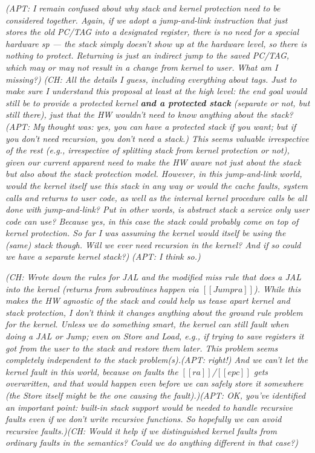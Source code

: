 \documentclass{article}
\newcommand{\ch}[1]{{\color{dkblue}\em (CH: #1)}}
\newcommand{\apt}[1]{{\color{red}\em (APT: #1)}}
\newcommand*{\EG}{e.g.,\xspace}
\begin{document}
\apt{I remain confused about why stack and kernel protection need to be considered
together.  Again, if we adopt a jump-and-link instruction that just stores
the old PC/TAG into a designated register, there is no need for a special hardware
sp --- the stack simply doesn't show up at the hardware level, so there is nothing
to protect. Returning is just an indirect jump to the saved PC/TAG, which 
may or may not result in a change from kernel to user. What am I missing?}
\ch{All the details I guess, including everything about tags. Just to
  make sure I understand this proposal at least at the high level: the
  end goal would still be to provide a protected kernel {\bf and a
    protected stack} (separate or not, but still there), just that the
  HW wouldn't need to know anything about the stack?
\apt{My thought was: yes, you can have a protected stack if you want; 
  but if you don't need recursion, you don't need a stack.} 
This seems
  valuable irrespective of the rest (\EG irrespective of splitting
  stack from kernel protection or not), given our current apparent
  need to make the HW aware not just about the stack but also about
  the stack protection model.  However, in this jump-and-link world,
  would the kernel itself use this stack in any way or would the
  cache faults, system calls and returns to user code,
  as well as the internal kernel procedure calls
  be all done with jump-and-link? Put in other words, is
  abstract stack a service only user code can use? Because yes, in
  this case the stack could probably come on top of kernel
  protection. So far I was assuming the kernel would itself be using
  the (same) stack though. Will we ever need recursion in the kernel?
  And if so could we have a separate kernel stack?}
\apt{I think so.}

\ottusedrule{\ottdruleStepXXJALXXHit{}}
\ottusedrule{\ottdruleStepXXMissNew{}}

\ch{Wrote down the rules for JAL and the modified miss rule that
  does a JAL into the kernel (returns from subroutines happen via
  $[[Jump ra]]$).
  While this makes the HW agnostic of the
  stack and could help us tease apart kernel and stack protection, I
  don't think it changes anything about the ground rule problem for
  the kernel. Unless we do something smart, the kernel can still fault
  when doing a JAL or Jump; even on Store and Load, \EG if trying to save
  registers it got from the user to the stack and restore them later.
  This problem seems completely independent to the stack problem(s).\apt{right!}
  And we can't let the kernel fault in this world, because on faults
  the $[[ra]]$/$[[epc]]$ gets overwritten, and that would happen even before we
  can safely store it somewhere (the Store itself might be the one
  causing the fault).}\apt{OK, you've identified an important point:
  built-in stack support would be needed to handle recursive \emph{faults} even
  if we don't write recursive functions. So hopefully we can avoid recursive faults.}\ch{Would it help if we distinguished kernel faults from
  ordinary faults in the semantics? Could we do anything different in
  that case?}
\end{document}
